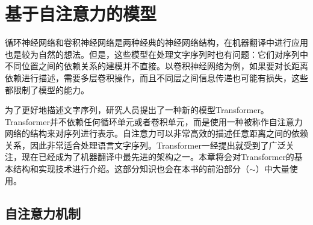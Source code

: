 
%


\renewcommand\figurename{图}%
\renewcommand\tablename{表}%


\chapter{基于自注意力的模型}

循环神经网络和卷积神经网络是两种经典的神经网络结构，在机器翻译中进行应用也是较为自然的想法。但是，这些模型在处理文字序列时也有问题：它们对序列中不同位置之间的依赖关系的建模并不直接。以卷积神经网络为例，如果要对长距离依赖进行描述，需要多层卷积操作，而且不同层之间信息传递也可能有损失，这些都限制了模型的能力。

为了更好地描述文字序列，研究人员提出了一种新的模型Transformer。Transformer并不依赖任何循环单元或者卷积单元，而是使用一种被称作自注意力网络的结构来对序列进行表示。自注意力可以非常高效的描述任意距离之间的依赖关系，因此非常适合处理语言文字序列。Transformer一经提出就受到了广泛关注，现在已经成为了机器翻译中最先进的架构之一。本章将会对Transformer的基本结构和实现技术进行介绍。这部分知识也会在本书的前沿部分（{\chapterthirteen}$\sim${\chaptereighteen}）中大量使用。

\section{自注意力机制}
\vspace{0.5em}
\label{sec:12.1}

